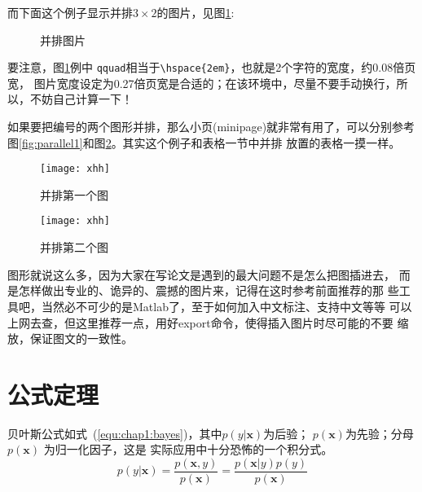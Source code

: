 而下面这个例子显示并排$3\times2$的图片，见图\ref{fig:subfig:3x2}:
\begin{figure}[htb]
  \centering
   \qquad
   \qquad
   \qquad
   \qquad
   \qquad
  \caption{并排图片}
  \label{fig:subfig:3x2}
\end{figure}

要注意，图\ref{fig:subfig:3x2}例中
\texttt{qquad}相当于\verb|\hspace{2em}|，也就是2个字符的宽度，约0.08倍页宽，
图片宽度设定为0.27倍页宽是合适的；在该环境中，尽量不要手动换行，所以，不妨自己计算一下！

如果要把编号的两个图形并排，那么小页(minipage)就非常有用了，可以分别参考
图\ref{fig:parallel1}和图\ref{fig:parallel2}。其实这个例子和表格一节中并排
放置的表格一摸一样。
\begin{figure}[htb]
  \begin{minipage}{0.48\textwidth}
    \centering
    \texttt{[image: xhh]}
    \caption{并排第一个图}
    \label{fig:parallel1}
  \end{minipage}\hfill
  \begin{minipage}{0.48\textwidth}
    \centering
    \texttt{[image: xhh]}
    \caption{并排第二个图}
    \label{fig:parallel2}
  \end{minipage}
\end{figure}

图形就说这么多，因为大家在写论文是遇到的最大问题不是怎么把图插进去，
而是怎样做出专业的、诡异的、震撼的图片来，记得在这时参考前面推荐的那
些工具吧，当然必不可少的是Matlab了，至于如何加入中文标注、支持中文等等
可以上网去查，但这里{\kai 推荐一点}，用好export命令，使得插入图片时尽可能的不要
缩放，保证图文的一致性。

\section{公式定理}
\label{sec:equation}
贝叶斯公式如式~(\ref{equ:chap1:bayes})，其中$p(y|\mathbf{x})$为后验；
$p(\mathbf{x})$为先验；分母$p(\mathbf{x})$ 为归一化因子，这是
实际应用中十分恐怖的一个积分式。
\begin{equation}
  \label{equ:chap1:bayes}
  p(y|\mathbf{x}) = \frac{p(\mathbf{x},y)}{p(\mathbf{x})}=
  \frac{p(\mathbf{x}|y)p(y)}{p(\mathbf{x})}
\end{equation}

